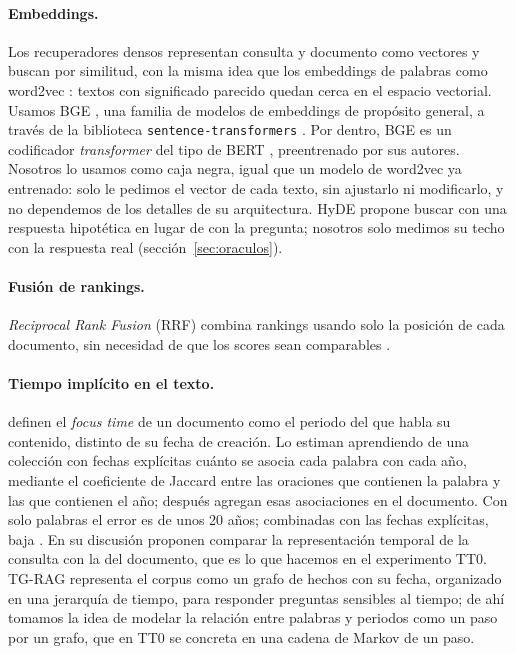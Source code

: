 \documentclass[11pt,a4paper]{article}
\begin{document}
\paragraph{Embeddings.} Los recuperadores densos representan consulta y documento como vectores y buscan por similitud, con la misma idea que los embeddings de palabras como word2vec \citep{mikolov2013distributed}: textos con significado parecido quedan cerca en el espacio vectorial. Usamos BGE \citep{xiao2024cpack}, una familia de modelos de embeddings de propósito general, a través de la biblioteca \texttt{sentence-transformers} \citep{reimers2019sentence}. Por dentro, BGE es un codificador \emph{transformer} \citep{vaswani2017attention} del tipo de BERT \citep{devlin2019bert}, preentrenado por sus autores. Nosotros lo usamos como caja negra, igual que un modelo de word2vec ya entrenado: solo le pedimos el vector de cada texto, sin ajustarlo ni modificarlo, y no dependemos de los detalles de su arquitectura. HyDE \citep{gao2023precise} propone buscar con una respuesta hipotética en lugar de con la pregunta; nosotros solo medimos su techo con la respuesta real (sección~\ref{sec:oraculos}).

\paragraph{Fusión de rankings.} \emph{Reciprocal Rank Fusion} (RRF) combina rankings usando solo la posición de cada documento, sin necesidad de que los scores sean comparables \citep{cormack2009reciprocal}.

\paragraph{Tiempo implícito en el texto.} \citet{jatowt2013focus} definen el \emph{focus time} de un documento como el periodo del que habla su contenido, distinto de su fecha de creación. Lo estiman aprendiendo de una colección con fechas explícitas cuánto se asocia cada palabra con cada año, mediante el coeficiente de Jaccard entre las oraciones que contienen la palabra y las que contienen el año; después agregan esas asociaciones en el documento. Con solo palabras el error es de unos 20 años; combinadas con las fechas explícitas, baja \citep[ver también][]{jatowt2015generic}. En su discusión proponen comparar la representación temporal de la consulta con la del documento, que es lo que hacemos en el experimento TT0. TG-RAG \citep{han2025tgrag} representa el corpus como un grafo de hechos con su fecha, organizado en una jerarquía de tiempo, para responder preguntas sensibles al tiempo; de ahí tomamos la idea de modelar la relación entre palabras y periodos como un paso por un grafo, que en TT0 se concreta en una cadena de Markov de un paso.
\end{document}
